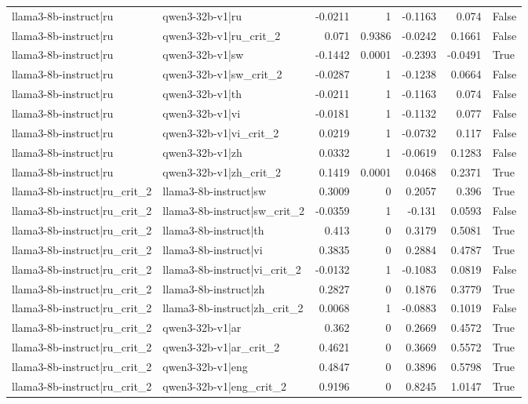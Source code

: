 \begin{table}
\begin{tabular}{l l r r r r l}
llama3-8b-instruct|ru & qwen3-32b-v1|ru & -0.0211 & 1 & -0.1163 & 0.074 & False \\
llama3-8b-instruct|ru & qwen3-32b-v1|ru_crit_2 & 0.071 & 0.9386 & -0.0242 & 0.1661 & False \\
llama3-8b-instruct|ru & qwen3-32b-v1|sw & -0.1442 & 0.0001 & -0.2393 & -0.0491 & True \\
llama3-8b-instruct|ru & qwen3-32b-v1|sw_crit_2 & -0.0287 & 1 & -0.1238 & 0.0664 & False \\
llama3-8b-instruct|ru & qwen3-32b-v1|th & -0.0211 & 1 & -0.1163 & 0.074 & False \\
llama3-8b-instruct|ru & qwen3-32b-v1|vi & -0.0181 & 1 & -0.1132 & 0.077 & False \\
llama3-8b-instruct|ru & qwen3-32b-v1|vi_crit_2 & 0.0219 & 1 & -0.0732 & 0.117 & False \\
llama3-8b-instruct|ru & qwen3-32b-v1|zh & 0.0332 & 1 & -0.0619 & 0.1283 & False \\
llama3-8b-instruct|ru & qwen3-32b-v1|zh_crit_2 & 0.1419 & 0.0001 & 0.0468 & 0.2371 & True \\
llama3-8b-instruct|ru_crit_2 & llama3-8b-instruct|sw & 0.3009 & 0 & 0.2057 & 0.396 & True \\
llama3-8b-instruct|ru_crit_2 & llama3-8b-instruct|sw_crit_2 & -0.0359 & 1 & -0.131 & 0.0593 & False \\
llama3-8b-instruct|ru_crit_2 & llama3-8b-instruct|th & 0.413 & 0 & 0.3179 & 0.5081 & True \\
llama3-8b-instruct|ru_crit_2 & llama3-8b-instruct|vi & 0.3835 & 0 & 0.2884 & 0.4787 & True \\
llama3-8b-instruct|ru_crit_2 & llama3-8b-instruct|vi_crit_2 & -0.0132 & 1 & -0.1083 & 0.0819 & False \\
llama3-8b-instruct|ru_crit_2 & llama3-8b-instruct|zh & 0.2827 & 0 & 0.1876 & 0.3779 & True \\
llama3-8b-instruct|ru_crit_2 & llama3-8b-instruct|zh_crit_2 & 0.0068 & 1 & -0.0883 & 0.1019 & False \\
llama3-8b-instruct|ru_crit_2 & qwen3-32b-v1|ar & 0.362 & 0 & 0.2669 & 0.4572 & True \\
llama3-8b-instruct|ru_crit_2 & qwen3-32b-v1|ar_crit_2 & 0.4621 & 0 & 0.3669 & 0.5572 & True \\
llama3-8b-instruct|ru_crit_2 & qwen3-32b-v1|eng & 0.4847 & 0 & 0.3896 & 0.5798 & True \\
llama3-8b-instruct|ru_crit_2 & qwen3-32b-v1|eng_crit_2 & 0.9196 & 0 & 0.8245 & 1.0147 & True \\

\end{tabular}
\end{table}
